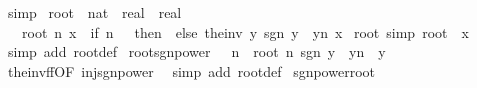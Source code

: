 \begin{isabellebody}
\ simp%
\endisatagproof
{\isafoldproof}%
%
\isadelimproof
\isanewline
%
\endisadelimproof
\isanewline
{}\isamarkupfalse%
\ root\ {\isacharcolon}{\kern0pt}{\isacharcolon}{\kern0pt}\ {\isachardoublequoteopen}nat\ {\isasymRightarrow}\ real\ {\isasymRightarrow}\ real{\isachardoublequoteclose}\isanewline
\ \ \ {\isachardoublequoteopen}root\ n\ x\ {\isacharequal}{\kern0pt}\ {\isacharparenleft}{\kern0pt}if\ n\ {\isacharequal}{\kern0pt}\ {}\ then\ {}\ else\ the{\isacharunderscore}{\kern0pt}inv\ {\isacharparenleft}{\kern0pt}{\isasymlambda}y{\isachardot}{\kern0pt}\ sgn\ y\ {\isacharasterisk}{\kern0pt}\ {\isasymbar}y{\isasymbar}{\isacharcircum}{\kern0pt}n{\isacharparenright}{\kern0pt}\ x{\isacharparenright}{\kern0pt}{\isachardoublequoteclose}\isanewline
\isanewline
{}\isamarkupfalse%
\ root{\isacharunderscore}{\kern0pt}{}\ {\isacharbrackleft}{\kern0pt}simp{\isacharbrackright}{\kern0pt}{\isacharcolon}{\kern0pt}\ {\isachardoublequoteopen}root\ {}\ x\ {\isacharequal}{\kern0pt}\ {}{\isachardoublequoteclose}\isanewline
%
\isadelimproof
\ \ %
\endisadelimproof
%
\isatagproof
{}\isamarkupfalse%
\ {\isacharparenleft}{\kern0pt}simp\ add{\isacharcolon}{\kern0pt}\ root{\isacharunderscore}{\kern0pt}def{\isacharparenright}{\kern0pt}%
\endisatagproof
{\isafoldproof}%
%
\isadelimproof
\isanewline
%
\endisadelimproof
\isanewline
{}\isamarkupfalse%
\ root{\isacharunderscore}{\kern0pt}sgn{\isacharunderscore}{\kern0pt}power{\isacharcolon}{\kern0pt}\ {\isachardoublequoteopen}{}\ {\isacharless}{\kern0pt}\ n\ {\isasymLongrightarrow}\ root\ n\ {\isacharparenleft}{\kern0pt}sgn\ y\ {\isacharasterisk}{\kern0pt}\ {\isasymbar}y{\isasymbar}{\isacharcircum}{\kern0pt}n{\isacharparenright}{\kern0pt}\ {\isacharequal}{\kern0pt}\ y{\isachardoublequoteclose}\isanewline
%
\isadelimproof
\ \ %
\endisadelimproof
%
\isatagproof
{}\isamarkupfalse%
\ the{\isacharunderscore}{\kern0pt}inv{\isacharunderscore}{\kern0pt}f{\isacharunderscore}{\kern0pt}f{\isacharbrackleft}{\kern0pt}OF\ inj{\isacharunderscore}{\kern0pt}sgn{\isacharunderscore}{\kern0pt}power{\isacharbrackright}{\kern0pt}\ \isamarkupfalse%
\ {\isacharparenleft}{\kern0pt}simp\ add{\isacharcolon}{\kern0pt}\ root{\isacharunderscore}{\kern0pt}def{\isacharparenright}{\kern0pt}%
\endisatagproof
{\isafoldproof}%
%
\isadelimproof
\isanewline
%
\endisadelimproof
\isanewline
{}\isamarkupfalse%
\ sgn{\isacharunderscore}{\kern0pt}power{\isacharunderscore}{\kern0pt}root{\isacharcolon}{\kern0pt}\isanewline

\end{isabellebody}
